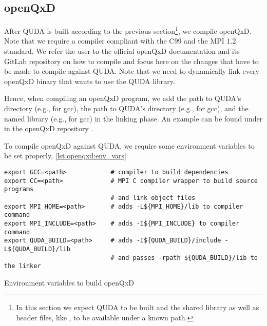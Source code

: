 \subsection{openQxD}
\label{sec:building:openqxd}

After QUDA is built according to the previous section\footnote{In this section we expect QUDA to be built and the shared library  as well as header files, like , to be available under a known path.}, we compile openQxD. Note that we require a compiler compliant with the C99 and the MPI 1.2 standard. We refer the user to the official openQxD documentation \cite{openqxd} and its GitLab repository \cite{gitlab:openqxd} on how to compile and focus here on the changes that have to be made to compile against QUDA. Note that we need to dynamically link every openQxD binary that wants to use the QUDA library.


Hence, when compiling an openQxD program, we add the path to QUDA's  directory (e.g.,  for gcc), the path to QUDA's  directory (e.g.,  for gcc), and the named library (e.g.,  for gcc) in the linking phase. An example  can be found under  in the openQxD repository \cite{gitlab:openqxd-devel}.

To compile openQxD against QUDA, we require some environment variables to be set properly, \cref{lst:openqxd:env_vars}

\begin{codelisting}
\begin{verbatim}
export GCC=<path>            # compiler to build dependencies
export CC=<path>             # MPI C compiler wrapper to build source programs
                             # and link object files
export MPI_HOME=<path>       # adds -L${MPI_HOME}/lib to compiler command
export MPI_INCLUDE=<path>    # adds -I${MPI_INCLUDE} to compiler command
export QUDA_BUILD=<path>     # adds -I${QUDA_BUILD}/include -L${QUDA_BUILD}/lib
                             # and passes -rpath ${QUDA_BUILD}/lib to the linker
\end{verbatim}
\caption{Environment variables to build openQxD}
\label{lst:openqxd:env_vars}
\end{codelisting}


